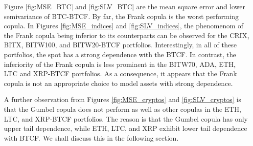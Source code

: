 
Figure \ref{fig:MSE_BTC} and \ref{fig:SLV_BTC} are the mean square
error and lower semivariance of BTC-BTCF. By far, the Frank copula
is the worst performing copula.
In Figures \ref{fig:MSE_indices} and \ref{fig:SLV_indices}, the
phenomenom of the Frank copula being inferior to its counterparts can
be observed for the CRIX, BITX, BITW100, and
BITW20-BTCF portfolios.
Interestingly, in all of these portfolios, the spot has a
strong dependence with the BTCF.
In contrast, the inferiority of the Frank copula is less prominent in
the BITW70, ADA, ETH, LTC and XRP-BTCF portfolios.
As a consequence, it appears that the Frank copula is not an
appropriate choice to model assets with strong dependence.

A further observation from Figures \ref{fig:MSE_cryptos} and
\ref{fig:SLV_cryptos} is that the Gumbel copula does not perform as
well as other copulas in the ETH, LTC, and XRP-BTCF portfolios.
The reason is that the Gumbel copula has only upper tail dependence,
while ETH, LTC, and XRP exhibit lower tail dependence with BTCF.
We shall discuss this in the following section.


